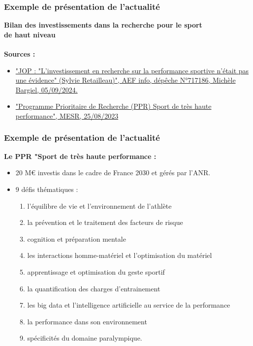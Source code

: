\documentclass[xcolor=dvipsnames]{beamer}
\begin{document}
	\begin{frame}
		\frametitle{Exemple de présentation de l'actualité}
		\textbf{Bilan des investissements dans la recherche pour le sport\\de haut niveau\\}
		\textbf{\\Sources :}
		\begin{itemize}
			\item \href{https://www.aefinfo.fr/depeche/717186-jop-l-investissement-en-recherche-sur-la-performance-sportive-n-etait-pas-une-evidence-sylvie-retailleau}{"JOP : "L'investissement en recherche sur la performance sportive n'était pas une évidence" (Sylvie Retailleau)", AEF info, dépêche N°717186, Michèle Bargiel, 05/09/2024.}
			\item \href{https://www.enseignementsup-recherche.gouv.fr/fr/programme-prioritaire-de-recherche-ppr-sport-de-tres-haute-performance-92142}{"Programme Prioritaire de Recherche (PPR) Sport de très haute performance", MESR, 25/08/2023}
		\end{itemize}
	\end{frame}
	
	
	\begin{frame}
		\frametitle{Exemple de présentation de l'actualité}
		\textbf{Le PPR "Sport de très haute performance :}
		\begin{itemize}
			\item 20 M€ investis dans le cadre de France 2030 et gérés par l'ANR.
			\item 9 défis thématiques :
			\begin{multicols}{2}
				\begin{enumerate}
					\tiny
					\item l'équilibre de vie et l'environnement de l'athlète
					\item la prévention et le traitement des facteurs de risque
					\item cognition et préparation mentale
					\item les interactions homme-matériel et l'optimisation du matériel
					\item apprentissage et optimisation du geste sportif
					\item la quantification des charges d'entrainement
					\item les big data et l'intelligence artificielle au service de la performance
					\item la performance dans son environnement
					\item spécificités du domaine paralympique.
				\end{enumerate}
				\normalsize
			\end{multicols}
		\end{itemize}
	\end{frame}
	
\end{document}
